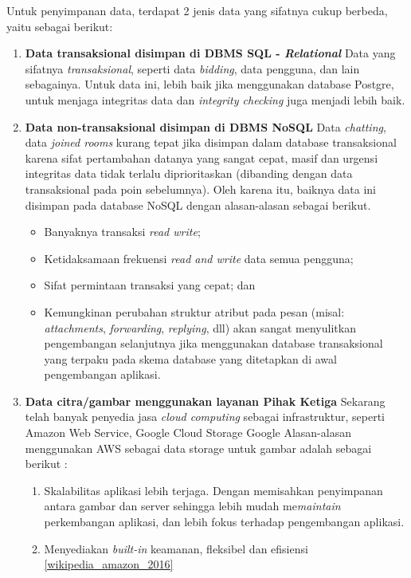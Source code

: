 	Untuk penyimpanan data, terdapat 2 jenis data yang sifatnya cukup berbeda, yaitu sebagai berikut:
	\begin{enumerate}
		\item \textbf{Data transaksional disimpan di DBMS SQL - \textit{Relational}}
		\newline
		\indent Data yang sifatnya \textit{transaksional}, seperti data \textit{bidding}, data pengguna, dan lain sebagainya.
		Untuk data ini, lebih baik jika menggunakan database Postgre, untuk menjaga integritas data dan \textit{integrity checking} juga  menjadi lebih baik.
		\item \textbf{Data non-transaksional disimpan di DBMS NoSQL}
		\newline
		\indent Data \textit{chatting}, data \textit{joined rooms} kurang tepat jika disimpan dalam database transaksional karena sifat pertambahan datanya yang sangat cepat, masif dan urgensi integritas data tidak terlalu diprioritaskan (dibanding dengan data transaksional pada poin sebelumnya). Oleh karena itu, baiknya data ini disimpan pada database NoSQL dengan alasan-alasan sebagai berikut.
		\begin{itemize} 
			\item Banyaknya transaksi \textit{read write};
			\item Ketidaksamaan frekuensi \textit{read and write} data semua pengguna;
			\item Sifat permintaan transaksi yang cepat; dan
			\item Kemungkinan perubahan struktur atribut pada pesan (misal: \textit{attachments}, \textit{forwarding}, \textit{replying}, dll) akan sangat menyulitkan pengembangan selanjutnya jika menggunakan database transaksional yang terpaku pada skema database yang ditetapkan di awal pengembangan aplikasi.
		\end{itemize} 	
		
		\item \textbf{Data citra/gambar menggunakan layanan Pihak Ketiga} \newline
		\indent Sekarang telah banyak penyedia jasa \textit{cloud computing} sebagai infrastruktur, seperti Amazon Web Service, Google Cloud Storage Google Alasan-alasan menggunakan AWS sebagai data storage untuk gambar adalah sebagai berikut :
		\begin{enumerate}[noitemsep,topsep=0pt]
			\item Skalabilitas aplikasi lebih terjaga. 
			\newline Dengan memisahkan penyimpanan antara gambar dan server sehingga lebih mudah me\textit{maintain} perkembangan aplikasi, dan lebih fokus terhadap pengembangan aplikasi.
			\item Menyediakan \textit{built-in} keamanan, fleksibel dan efisiensi \ref{wikipedia_amazon_2016}
		\end{enumerate}
		

\end{enumerate}
